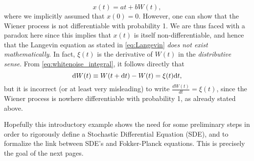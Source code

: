 \begin{equation}
	x(t) = at + bW(t),
\end{equation}
where we implicitly assumed that $x(0) = 0$. However, one can show that the Wiener process is not differentiable with probability 1. We are thus faced with a paradox here since this implies that $x(t)$ is itself non-differentiable, and hence that the Langevin equation as stated in \eqref{eq:Langevin} \textit{does not exist mathematically}. In fact, $\xi(t)$ is the derivative of $W(t)$ in the \textit{distributive sense}. From \eqref{eq:whitenoise_integral}, it follows directly that
\begin{equation}\label{eq:dW}
	\rm dW(t) \equiv W(t+\rm dt) - W(t) = \xi(t) \rm dt,
\end{equation}
but it is incorrect (or at least very misleading) to write $\frac{dW(t)}{dt} = \xi(t)$, since the Wiener process is nowhere differentiable with probability 1, as already stated above.

Hopefully this introductory example shows the need for some preliminary steps in order to rigorously define a Stochastic Differential Equation (SDE), and to formalize the link between SDE's and Fokker-Planck equations. This is precisely the goal of the next pages.

